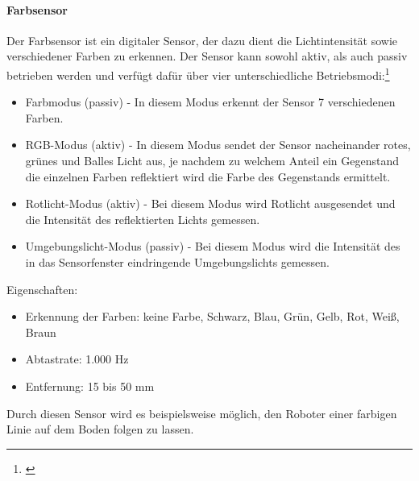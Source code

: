 \paragraph{Farbsensor}
\color{finishing}
Der Farbsensor ist ein digitaler Sensor, der dazu dient die Lichtintensität sowie verschiedener Farben zu erkennen. Der Sensor kann sowohl
aktiv, als auch passiv betrieben werden und verfügt dafür über vier unterschiedliche Betriebsmodi:\footnote{\citep[vgl.][EV3-Programmieren mit Java, Seite 101]{Schobel.RobertaEV3Programmieren}\label{note29}}
\begin{itemize}
	\item{Farbmodus (passiv)} - In diesem Modus erkennt der Sensor 7 verschiedenen Farben.
	\item{RGB-Modus (aktiv)} - In diesem Modus sendet der Sensor nacheinander rotes, grünes und Balles Licht aus, je nachdem zu welchem Anteil ein Gegenstand die einzelnen Farben reflektiert wird die Farbe des Gegenstands ermittelt.
	\item{Rotlicht-Modus (aktiv)} - Bei diesem Modus wird Rotlicht ausgesendet und die Intensität des reflektierten Lichts gemessen.
	\item{Umgebungslicht-Modus (passiv)} - Bei diesem Modus wird die Intensität des in das Sensorfenster eindringende Umgebungslichts gemessen.
\end{itemize}
\smallskip
Eigenschaften:
\begin{itemize}
	\item{Erkennung der Farben:} keine Farbe, Schwarz, Blau, Grün, Gelb, Rot, Weiß, Braun
	\item{Abtastrate:} 1.000 Hz
	\item{Entfernung:} 15 bis 50 mm
\end{itemize}
Durch diesen Sensor wird es beispielsweise möglich, den Roboter einer farbigen Linie auf dem Boden folgen zu lassen.
